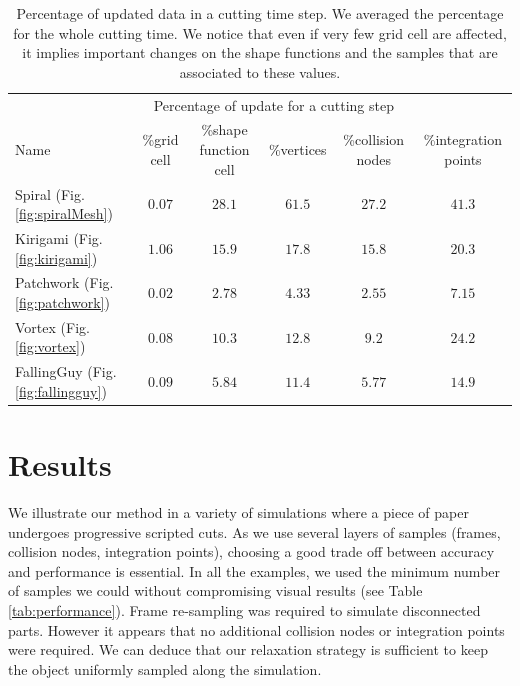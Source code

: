 \addtolength{\tabcolsep}{1.5pt}

\begin{table}[!ht]
\centering
\scalebox{0.7}
{
\begin{tabular}{l|ccccc}
& \multicolumn{4}{c}{Percentage of update for a cutting step} \\
Name & \%grid cell &\%shape function cell & \%vertices & \%collision nodes & \%integration points \\ \hline
Spiral (Fig. \ref{fig:spiralMesh}) & $0.07$ & $28.1$ & $61.5$ & $27.2$ & $41.3$\\
Kirigami (Fig. \ref{fig:kirigami}) & $1.06$ & $15.9$ & $17.8$ & $15.8$ & $20.3$\\
Patchwork (Fig. \ref{fig:patchwork}) & $0.02$ & $2.78$ & $4.33$ & $2.55$ & $7.15$\\
Vortex (Fig. \ref{fig:vortex}) & $0.08$ & $10.3$ & $12.8$ & $9.2$ & $24.2$\\
FallingGuy (Fig. \ref{fig:fallingguy}) & $0.09$ & $5.84$ & $11.4$ & $5.77$ & $14.9$\\
\end{tabular}
}
\caption[Frame-based cutting: Incremental update timings]{\label{tab:incrementalUpdate} Percentage of updated data in a cutting time step. We averaged the percentage for the whole cutting time. We notice that even if very few grid cell are affected, it implies important changes on the shape functions and the samples that are associated to these values.}
\end{table}

\section{Results} \label{sec:results}

We illustrate our method in a variety of simulations where a piece of paper undergoes progressive scripted cuts. As we use several layers of samples (frames, collision nodes, integration points), choosing a good trade off between accuracy and performance is essential. In all the examples, we used the minimum number of samples we could without compromising visual results (see Table \ref{tab:performance}). Frame re-sampling was required to simulate disconnected parts. However it appears that no additional collision nodes or integration points were required. We can deduce that our relaxation strategy is sufficient to keep the object uniformly sampled along the simulation.

